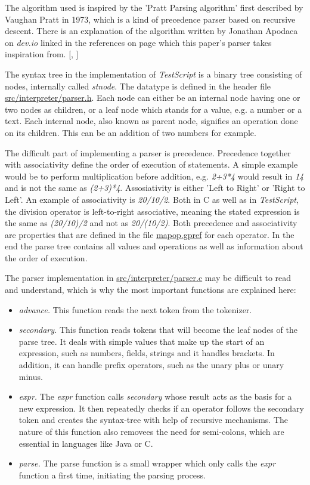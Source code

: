 \documentclass[12pt,a4paper]{article}
\newcommand{\hrc}[1]{\hyperref[#1]{#1}}
\newcommand{\name}{\emph{TestScript}}
\begin{document}
The algorithm used is inspired by the 'Pratt Parsing
algorithm' first described by Vaughan Pratt in 1973, which is a kind of precedence
parser based on recursive descent. There is an explanation of the algorithm
written by Jonathan Apodaca on \emph{dev.io} linked in the references on page 
\pageref{bibliography} which this paper's parser takes inspiration from.
[, ]

The syntax tree in the implementation of \name{} is a binary tree consisting of nodes, internally
called \emph{stnode}. The datatype is defined in the header file \hrc{src/interpreter/parser.h}.
Each node can either be an internal node having one or two nodes as children, or a leaf node
which stands for a value, e.g. a number or a text. Each internal node, also known as parent node, signifies
an operation done on its children. This can be an addition of two numbers for example. 

The difficult part of implementing a parser is precedence. Precedence together
with associativity define the order of execution of statements. A simple example
would be to perform multiplication before addition, e.g. \emph{2+3*4} would
result in \emph{14} and is not the same as \emph{(2+3)*4}.
Assosiativity is either 'Left to Right' or 'Right to Left'. An example of associativity is
\emph{20/10/2}. Both in C as well as in \name{}, the division operator is
left-to-right associative, meaning the stated expression is the same as
\emph{(20/10)/2} and not as \emph{20/(10/2)}. Both precedence 
and associativity are properties that are defined in the file \hrc{mapop.gpref} for
each operator.
In the end the parse tree contains all values and 
operations as well as information about the order of execution.

The parser implementation in \hrc{src/interpreter/parser.c} may be difficult to
read and understand, which is why the most important functions are explained here:
\begin{itemize}
    \item \emph{advance.} This function reads the next token from the tokenizer.
    \item \emph{secondary.} This function reads tokens that will become the leaf nodes
        of the parse tree.
        It deals with simple values that make up the start of an expression, such as numbers,
        fields, strings and it handles brackets. 
        In addition, it can handle prefix operators, such as the unary plus or unary minus.
    \item \emph{expr.} The \emph{expr} function calls \emph{secondary} whose result acts
        as the basis for a new expression. It then repeatedly checks
        if an operator follows the secondary token and creates the syntax-tree
        with help of recursive mechanisms. The nature of this function also 
        removees the need for semi-colons,
        which are essential in languages like Java or C.
    \item \emph{parse.} The parse function is a small wrapper which only
        calls the \emph{expr} function a first time, initiating the parsing process.
\end{itemize}
\end{document}
